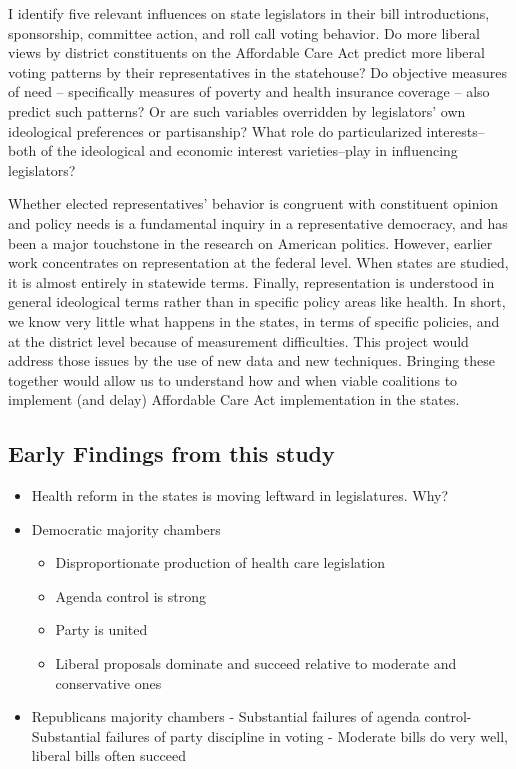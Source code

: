 \documentclass[
  oneside]{book}
\providecommand{\tightlist}{%
  \setlength{\itemsep}{0pt}\setlength{\parskip}{0pt}}
\begin{document}
I identify five relevant influences on state legislators in their bill introductions, sponsorship, committee action, and roll call voting behavior. Do more liberal views by district constituents on the Affordable Care Act predict more liberal voting patterns by their representatives in the statehouse? Do objective measures of need -- specifically measures of poverty and health insurance coverage -- also predict such patterns? Or are such variables overridden by legislators' own ideological preferences or partisanship? What role do particularized interests--both of the ideological and economic interest varieties--play in influencing legislators?

Whether elected representatives' behavior is congruent with constituent opinion and policy needs is a fundamental inquiry in a representative democracy, and has been a major touchstone in the research on American politics. However, earlier work concentrates on representation at the federal level. When states are studied, it is almost entirely in statewide terms. Finally, representation is understood in general ideological terms rather than in specific policy areas like health. In short, we know very little what happens in the states, in terms of specific policies, and at the district level because of measurement difficulties. This project would address those issues by the use of new data and new techniques. Bringing these together would allow us to understand how and when viable coalitions to implement (and delay) Affordable Care Act implementation in the states.

\hypertarget{early-findings-from-this-study}{%
\subsection{Early Findings from this study}\label{early-findings-from-this-study}}

\begin{itemize}
\tightlist
\item
  Health reform in the states is moving leftward in legislatures. Why?
\item
  Democratic majority chambers

  \begin{itemize}
  \tightlist
  \item
    Disproportionate production of health care legislation
  \item
    Agenda control is strong
  \item
    Party is united
  \item
    Liberal proposals dominate and succeed relative to moderate and conservative ones
  \end{itemize}
\item
  Republicans majority chambers
  - Substantial failures of agenda control- Substantial failures of party discipline in voting
  - Moderate bills do very well, liberal bills often succeed
\end{itemize}
\end{document}
